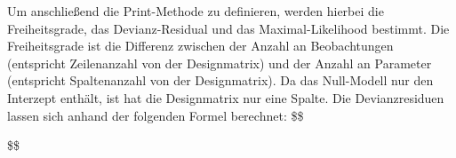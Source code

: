 \documentclass[12pt,]{article}
\newenvironment{Shaded}{\begin{snugshade}}{\end{snugshade}}
\newcommand{\KeywordTok}[1]{\textcolor[rgb]{0.13,0.29,0.53}{\textbf{#1}}}
\newcommand{\DecValTok}[1]{\textcolor[rgb]{0.00,0.00,0.81}{#1}}
\newcommand{\StringTok}[1]{\textcolor[rgb]{0.31,0.60,0.02}{#1}}
\newcommand{\CommentTok}[1]{\textcolor[rgb]{0.56,0.35,0.01}{\textit{#1}}}
\newcommand{\OperatorTok}[1]{\textcolor[rgb]{0.81,0.36,0.00}{\textbf{#1}}}
\newcommand{\NormalTok}[1]{#1}
\begin{document}
\begin{Shaded}
\end{Shaded}

Um anschließend die Print-Methode zu definieren, werden hierbei die
Freiheitsgrade, das Devianz-Residual und das Maximal-Likelihood
bestimmt. Die Freiheitsgrade ist die Differenz zwischen der Anzahl an
Beobachtungen (entspricht Zeilenanzahl von der Designmatrix) und der
Anzahl an Parameter (entspricht Spaltenanzahl von der Designmatrix). Da
das Null-Modell nur den Interzept enthält, ist hat die Designmatrix nur
eine Spalte. Die Devianzresiduen lassen sich anhand der folgenden Formel
berechnet: \$\$

\$\$
\end{document}
